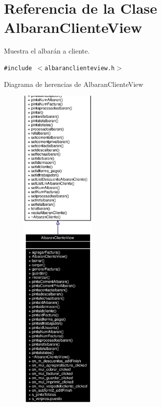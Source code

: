 \section{Referencia de la Clase Albaran\-Cliente\-View}
\label{classAlbaranClienteView}
Muestra el albar\'{a}n a cliente.  


{\tt \#include $<$albaranclienteview.h$>$}

Diagrama de herencias de Albaran\-Cliente\-View\begin{figure}[H]
\begin{center}
\leavevmode
\includegraphics[width=105pt]{classAlbaranClienteView__inherit__graph}
\end{center}
\end{figure}
